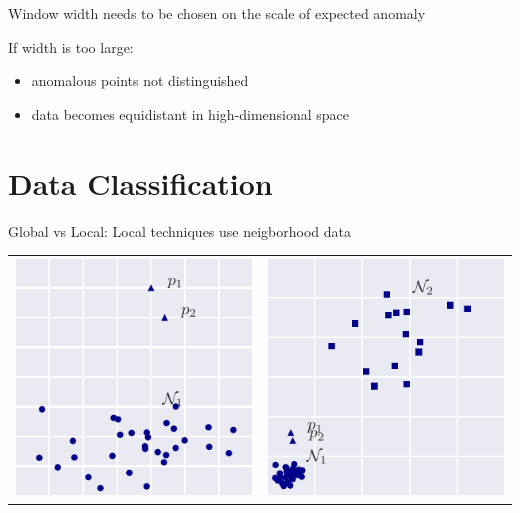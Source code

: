 \documentclass{beamer}
\begin{document}
  \begin{frame}{Window width needs to be chosen on the scale of expected anomaly}
    
    If width is too large:
    \begin{itemize}
      \item anomalous points not distinguished
      \item data becomes equidistant in high-dimensional space
    \end{itemize}

  \end{frame}


  \section{Data Classification}

  \begin{frame}{Global vs Local: Local techniques use neigborhood data}
    
    \centering
    \begin{tabular}{c|c}
      \includegraphics[width=.45\textwidth]{figs/hard1_dist.pdf} &
      \includegraphics[width=.45\textwidth]{figs/hard2_dist.pdf}
    \end{tabular}

  \end{frame}
\end{document}
